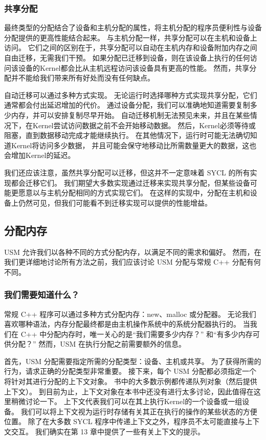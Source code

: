 \subsubsection{共享分配}
最终类型的分配结合了设备和主机分配的属性，将主机分配的程序员便利性与设备分配提供的更高性能结合起来。 
与主机分配一样，共享分配可以在主机和设备上访问。 
它们之间的区别在于，共享分配可以自动在主机内存和设备附加内存之间自由迁移，无需我们干预。 
如果分配已迁移到设备，则在该设备上执行的任何访问该设备的Kernel都会比从主机远程访问该设备具有更高的性能。 
然而，共享分配并不能给我们带来所有好处而没有任何缺点。

自动迁移可以通过多种方式实现。 无论运行时选择哪种方式实现共享分配，它们通常都会付出延迟增加的代价。 
通过设备分配，我们可以准确地知道需要复制多少内存，并可以安排复制尽早开始。 
自动迁移机制无法预见未来，并且在某些情况下，在Kernel尝试访问数据之前不会开始移动数据。 
然后，Kernel必须等待或阻塞，直到数据移动完成才能继续执行。 
在其他情况下，运行时可能无法确切知道Kernel将访问多少数据，
并且可能会保守地移动比所需数量更大的数据，这也会增加Kernel的延迟。

我们还应该注意，虽然共享分配可以迁移，但这并不一定意味着 SYCL 的所有实现都会迁移它们。 
我们期望大多数实现通过迁移来实现共享分配，但某些设备可能更愿意以与主机分配相同的方式实现它们。 
在这样的实现中，分配在主机和设备上仍然可见，但我们可能看不到迁移实现可以提供的性能增益。

\subsection{分配内存}
USM 允许我们以各种不同的方式分配内存，以满足不同的需求和偏好。 
然而，在我们更详细地讨论所有方法之前，我们应该讨论 USM 分配与常规 C++ 分配有何不同。

\subsubsection{我们需要知道什么？}
常规 C++ 程序可以通过多种方式分配内存：new、malloc 或分配器。 
无论我们喜欢哪种语法，内存分配最终都是由主机操作系统中的系统分配器执行的。 
当我们在 C++ 中分配内存时，唯一关心的是“我们需要多少内存？” 和“有多少内存可供分配？” 
然而，USM 在执行分配之前需要额外的信息。

首先，USM 分配需要指定所需的分配类型：设备、主机或共享。 为了获得所需的行为，请求正确的分配类型非常重要。 
接下来，每个 USM 分配都必须指定一个将针对其进行分配的上下文对象。 书中的大多数示例都传递队列对象（然后提供上下文）。 
到目前为止，上下文对象在本书中还没有进行太多讨论，因此值得在这里稍微讨论一下。 
上下文代表我们可以在其上执行Kernel的一个设备或一组设备。 
我们可以将上下文视为运行时存储有关其正在执行的操作的某些状态的方便位置。 
除了在大多数 SYCL 程序中传递上下文之外，程序员不太可能直接与上下文交互。 
我们确实在第 13 章中提供了一些有关上下文的提示。

